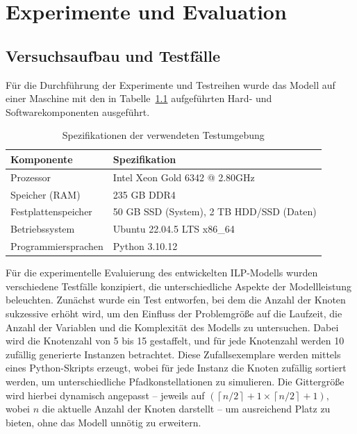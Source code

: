 \documentclass[bachelor, german]{algothesis}
\begin{document}
\chapter{Experimente und Evaluation}
\section{Versuchsaufbau und Testfälle}
Für die Durchführung der Experimente und Testreihen wurde das Modell auf einer Maschine mit den in Tabelle~\ref{tab:spezifikationen} aufgeführten Hard- und Softwarekomponenten ausgeführt.
\begin{table}[H]
    \centering
    \begin{tabular}{|l|l|}
        \hline
        \textbf{Komponente}         & \textbf{Spezifikation} \\
        \hline
        Prozessor                   & Intel Xeon Gold 6342 @ 2.80GHz \\
        \hline
        Speicher (RAM)              & 235 GB DDR4 \\
        \hline
        Festplattenspeicher         & 50 GB SSD (System), 2 TB HDD/SSD (Daten) \\
        \hline
        Betriebssystem              &  Ubuntu 22.04.5 LTS x86\_64 \\
        \hline
        Programmiersprachen         & Python 3.10.12 \\
        \hline
    \end{tabular}
    \caption{Spezifikationen der verwendeten Testumgebung}
    \label{tab:spezifikationen}
\end{table}
Für die experimentelle Evaluierung des entwickelten ILP-Modells wurden verschiedene Testfälle konzipiert, die unterschiedliche Aspekte der Modellleistung beleuchten. Zunächst wurde ein Test entworfen, bei dem die Anzahl der Knoten sukzessive erhöht wird, um den Einfluss der Problemgröße auf die Laufzeit, die Anzahl der Variablen und die Komplexität des Modells zu untersuchen. Dabei wird die Knotenzahl von 5 bis 15 gestaffelt, und für jede Knotenzahl werden 10 zufällig generierte Instanzen betrachtet. Diese Zufallsexemplare werden mittels eines Python-Skripts erzeugt, wobei für jede Instanz die Knoten zufällig sortiert werden, um unterschiedliche Pfadkonstellationen zu simulieren. Die Gittergröße wird hierbei dynamisch angepasst – jeweils auf $(\left\lceil n/2 \right\rceil+1 \times \left\lceil n/2 \right\rceil+1),$ wobei $n$ die aktuelle Anzahl der Knoten darstellt – um ausreichend Platz zu bieten, ohne das Modell unnötig zu erweitern.\newline
\end{document}

